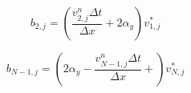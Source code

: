 \documentclass[12pt]{article}
\begin{document}
\begin{equation}
b_{2,j} = (\frac{v_{2,j}^n\Delta t}{\Delta x} + 2 \alpha_y)v_{1,j}^*
\end{equation}

\begin{equation}
b_{N-1,j} = ( 2 \alpha_y - \frac{v_{N-1,j}^n\Delta t}{\Delta x} +)v_{N,j}^*
\end{equation}



		
	
	
	
	
\end{document}
